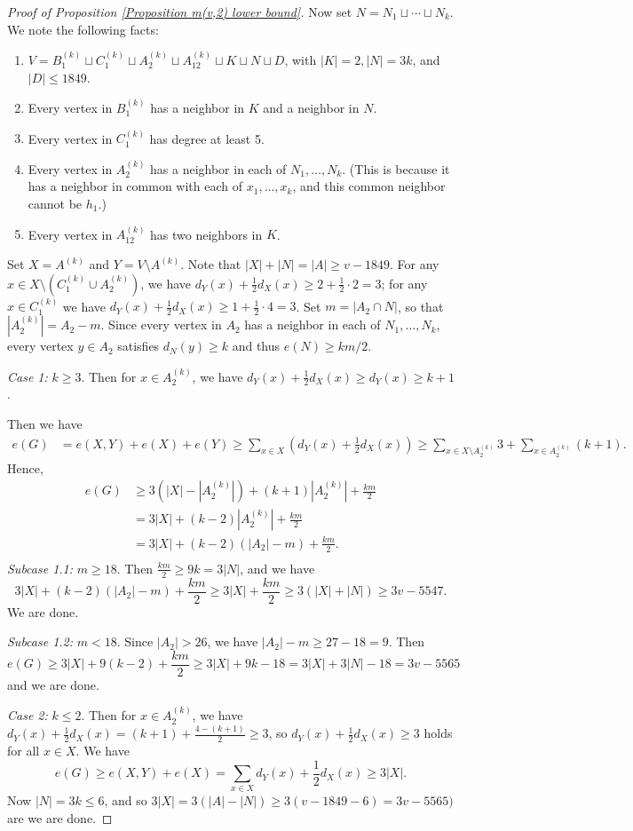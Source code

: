 \documentclass{article}
\newcommand\sm{\setminus}
\theoremstyle{definition}
\begin{document}
\begin{proof}[Proof of Proposition \ref{Proposition m(v,2) lower bound}]
    Now set $N=N_1\sqcup\cdots\sqcup N_k$. We note the following facts:
    \begin{enumerate}
        \item $V=B_1^{(k)}\sqcup C_1^{(k)}\sqcup A_2^{(k)}\sqcup A_{12}^{(k)}\sqcup K\sqcup  N\sqcup D$, with $|K|=2,|N|=3k$, and $|D|\le1849$.
        \item Every vertex in $B_1^{(k)}$ has a neighbor in $K$ and a neighbor in $N$.
        \item Every vertex in $C_1^{(k)}$ has degree at least 5. 
        \item Every vertex in $A_2^{(k)}$ has a neighbor in each of $N_1,\ldots, N_k$. (This is because it has a neighbor in common with each of $x_1,\ldots,x_k$, and this common neighbor cannot be $h_1$.)
        \item Every vertex in $A_{12}^{(k)}$ has two neighbors in $K$.
    \end{enumerate}
    Set $X=A^{(k)}$ and $Y=V\sm A^{(k)}$. Note that $|X|+|N|=|A|\ge v-1849$. For any $x\in X\sm (C_1^{(k)}\cup A_2^{(k)})$, we have $d_Y(x)+\frac{1}{2}d_X(x)\ge 2+\frac{1}{2}\cdot 2=3$; for any $x\in C_1^{(k)}$ we have $d_Y(x)+\frac{1}{2}d_X(x)\ge 1+\frac{1}{2}\cdot 4=3$. Set $m=|A_2\cap N|$, so that $|A_2^{(k)}|=A_2-m$. Since every vertex in $A_2$ has a neighbor in each of $N_1,\ldots,N_k$, every vertex $y\in A_2$ satisfies $d_N(y)\ge k$ and thus $e(N)\ge km/2$. 

    \textit{Case 1:} $k\ge 3$. Then for $x\in A_2^{(k)}$, we have $d_Y(x)+\frac{1}{2}d_X(x)\ge d_Y(x)\ge k+1$.

    Then we have 
    $$\begin{aligned}
        e(G)&=e(X,Y)+e(X)+e(Y)\ge\sum_{x\in X}\left(d_Y(x)+\frac{1}{2}d_X(x)\right)\ge\sum_{x\in X\sm A_2^{(k)}}3+\sum_{x\in A_2^{(k)}}(k+1).
    \end{aligned}$$
Hence,
    $$\begin{aligned}
        e(G)&\ge 3(|X|-|A_2^{(k)}|)+(k+1)|A_2^{(k)}|+\frac{km}{2}\\
        &=3|X|+(k-2)|A_2^{(k)}|+\frac{km}{2}\\
        &=3|X|+(k-2)(|A_2|-m)+\frac{km}{2}.\\
    \end{aligned}$$
\textit{Subcase 1.1:} $m\ge 18$. Then $\frac{km}{2}\ge 9k=3|N|$, and we have
$$3|X|+(k-2)(|A_2|-m)+\frac{km}{2}\ge 3|X|+\frac{km}{2}\ge 3(|X|+|N|)\ge 3v-5547.$$
We are done.

\textit{Subcase 1.2:} $m<18$. Since $|A_2|>26$, we have $|A_2|-m\ge 27-18= 9$. Then
$$e(G)\ge 3|X|+9(k-2)+\frac{km}{2}\ge 3|X|+9k-18=3|X|+3|N|-18=3v-5565$$
and we are done.

\textit{Case 2:} $k\le 2$. Then for $x\in A_2^{(k)}$, we have $d_Y(x)+\frac{1}{2}d_X(x)=(k+1)+\frac{4-(k+1)}{2}\ge 3$, so $d_Y(x)+\frac{1}{2}d_X(x)\ge 3$ holds for all $x\in X$. We have
$$e(G)\ge e(X,Y)+e(X)=\sum_{x\in X}d_Y(x)+\frac{1}{2}d_X(x)\ge 3|X|.$$
Now $|N|=3k\le 6$, and so $3|X|=3(|A|-|N|)\ge 3(v-1849-6)=3v-5565)$ are we are done.
\end{proof}
\end{document}
